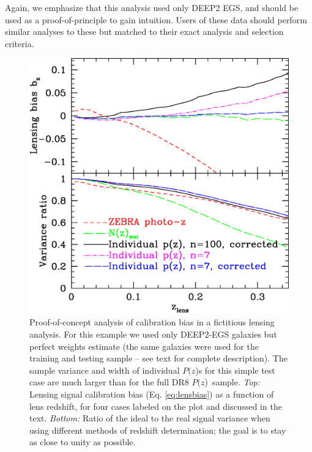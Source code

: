 \documentclass[12pt,preprint]{aastex}
\newcommand{\pofz}{$P(z$)}
\begin{document}
Again, we emphasize that this analysis used only DEEP2 EGS, and should be used
as a proof-of-principle to gain intuition.  Users of these data should perform
similar analyses to these but matched to their exact analysis and selection
criteria.

\begin{figure} [h]\centering
    \includegraphics[scale=0.5]{figures/pz.egs.c3n7.paper.eps}

    \caption{ Proof-of-concept analysis of calibration bias in a fictitious
    lensing analysis.  For this example we used only DEEP2-EGS galaxies but
    perfect weights estimate (the same galaxies were used for the training and
    testing sample -- see text for complete description). The sample variance
    and width of individual \pofz s for this simple test case are much larger
    than for the full DR8 \pofz\ sample.  {\em Top:} Lensing signal calibration
    bias (Eq.  \ref{eq:lensbias}) as a function of lens redshift, for four
    cases labeled on the plot and discussed in the text.  {\em Bottom:} Ratio
    of the ideal to the real signal variance when using different methods of
    redshift determination; the goal is to stay as close to unity as possible.
    \label{fig:simplebias}}

\end{figure}
\end{document}
